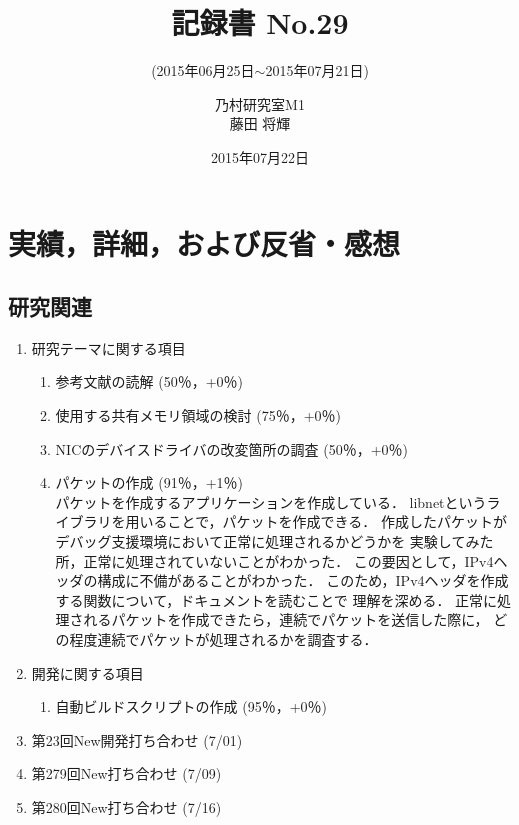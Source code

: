 \documentclass[fleqn, 14pt]{extarticlej}
\subtitle{(2015年06月25日$\sim$2015年07月21日)}
\author{乃村研究室M1\\藤田 将輝}
\date{2015年07月22日}
\title{記録書 No.29}
\begin{document}
\maketitle
\section{実績，詳細，および反省・感想}
\subsection{研究関連}
\label{sec-2-1}
\begin{enumerate}
    \item 研究テーマに関する項目
    \hfill
    \label{enum-research1}
    \begin{enumerate}
        \item 参考文献の読解
        \hfill
        \label{enum-1-A}
        (50％，+0％)
        \item 使用する共有メモリ領域の検討
        \hfill
        \label{enum-1-B}
        (75％，+0％)
        \item NICのデバイスドライバの改変箇所の調査
        \hfill
        \label{enum-1-C}
        (50％，+0％)
        \item パケットの作成
        \hfill
        \label{enum-1-D}
        (91％，+1％)\\
        パケットを作成するアプリケーションを作成している．
        libnetというライブラリを用いることで，パケットを作成できる．
        作成したパケットがデバッグ支援環境において正常に処理されるかどうかを
        実験してみた所，正常に処理されていないことがわかった．
        この要因として，IPv4ヘッダの構成に不備があることがわかった．
        このため，IPv4ヘッダを作成する関数について，ドキュメントを読むことで
        理解を深める．
        正常に処理されるパケットを作成できたら，連続でパケットを送信した際に，
        どの程度連続でパケットが処理されるかを調査する．
\end{enumerate}
    \item 開発に関する項目
        \hfill
        \label{enum-research2}
        \begin{enumerate}
            \item 自動ビルドスクリプトの作成
                \hfill
                \label{enum-2-A}
                (95％，+0％)
        \end{enumerate}
    \item 第23回New開発打ち合わせ
        \hfill
        \label{enum-research3}
        (7/01)
    \item 第279回New打ち合わせ
        \hfill
        \label{enum-research3}
        (7/09)
    \item 第280回New打ち合わせ
        \hfill
        \label{enum-research3}
        (7/16)

\end{enumerate}
\end{document}
